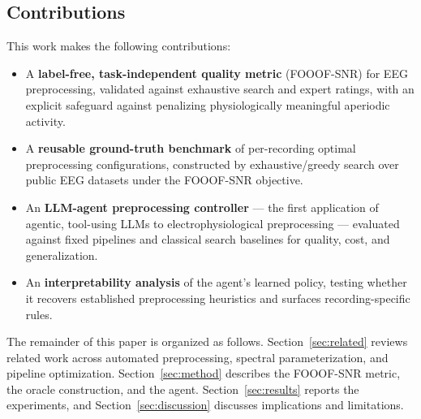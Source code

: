 \subsection{Contributions}

This work makes the following contributions:
\begin{itemize}
  \item A \textbf{label-free, task-independent quality metric} (FOOOF-SNR) for EEG preprocessing, validated against exhaustive search and expert ratings, with an explicit safeguard against penalizing physiologically meaningful aperiodic activity.
  \item A \textbf{reusable ground-truth benchmark} of per-recording optimal preprocessing configurations, constructed by exhaustive/greedy search over public EEG datasets under the FOOOF-SNR objective.
  \item An \textbf{LLM-agent preprocessing controller} --- the first application of agentic, tool-using LLMs to electrophysiological preprocessing --- evaluated against fixed pipelines and classical search baselines for quality, cost, and generalization.
  \item An \textbf{interpretability analysis} of the agent's learned policy, testing whether it recovers established preprocessing heuristics and surfaces recording-specific rules.
\end{itemize}

The remainder of this paper is organized as follows. Section~\ref{sec:related} reviews related work across automated preprocessing, spectral parameterization, and pipeline optimization. Section~\ref{sec:method} describes the FOOOF-SNR metric, the oracle construction, and the agent. Section~\ref{sec:results} reports the experiments, and Section~\ref{sec:discussion} discusses implications and limitations.
